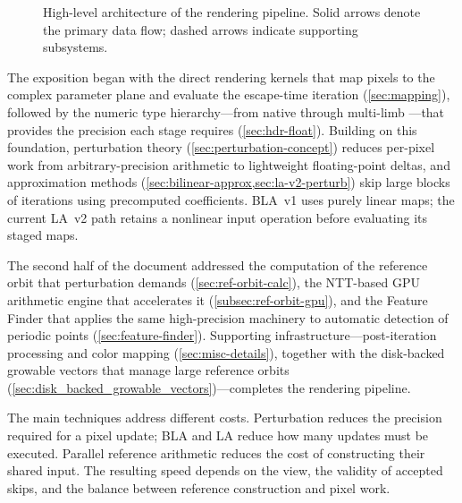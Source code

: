 \begin{figure}[!htbp]
\caption[End-to-end rendering pipeline]{High-level architecture of the
  \FractalShark{} rendering pipeline.  Solid arrows denote the primary
  data flow; dashed arrows indicate supporting subsystems.}
\label{fig:system-architecture}
\end{figure}

The exposition began with the direct rendering kernels that map pixels
to the complex parameter plane and evaluate the escape-time iteration
(\cref{sec:mapping}), followed by the numeric type hierarchy---from
native  through multi-limb ---that
provides the precision each stage requires (\cref{sec:hdr-float}).
Building on this foundation, perturbation theory
(\cref{sec:perturbation-concept}) reduces per-pixel work from
arbitrary-precision arithmetic to lightweight floating-point deltas,
and approximation methods (\cref{sec:bilinear-approx,sec:la-v2-perturb})
skip large blocks of iterations using precomputed coefficients.
BLA~v1 uses purely linear maps; the current LA~v2 path retains a
nonlinear input operation before evaluating its staged maps.

The second half of the document addressed the computation of the
reference orbit that perturbation demands
(\cref{sec:ref-orbit-calc}), the NTT-based GPU arithmetic engine that
accelerates it (\cref{subsec:ref-orbit-gpu}), and the Feature Finder
that applies the same high-precision machinery to automatic detection
of periodic points (\cref{sec:feature-finder}).  Supporting
infrastructure---post-iteration processing and color mapping
(\cref{sec:misc-details}), together with the disk-backed growable
vectors that manage large reference orbits
(\cref{sec:disk_backed_growable_vectors})---completes the rendering
pipeline.

The main techniques address different costs. Perturbation reduces the precision
required for a pixel update; BLA and LA reduce how many updates must be executed.
Parallel reference arithmetic reduces the cost of constructing their shared input.
The resulting speed depends on the view, the validity of accepted skips, and the
balance between reference construction and pixel work.

